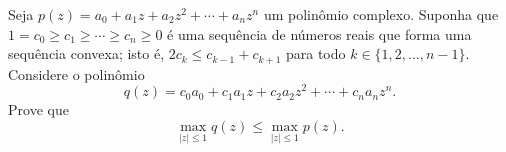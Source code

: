 Seja \(p(z)=a_0+a_1z+a_2z^2+\cdots+a_nz^n\) um polinômio complexo. Suponha que \(1=c_0\ge c_1\ge \cdots \ge c_n\ge 0\) é uma sequência de números reais que forma uma sequência convexa; isto é, \(2c_k\le c_{k-1}+c_{k+1}\) para todo \(k\in \{1,2,\dots,n-1\}\). Considere o polinômio
\[ q(z)=c_0a_0+c_1a_1z+c_2a_2z^2+\cdots +c_na_nz^n. \]
Prove que
\[ \max_{|z|\le 1}q(z)\le \max_{|z|\le 1}p(z). \]
